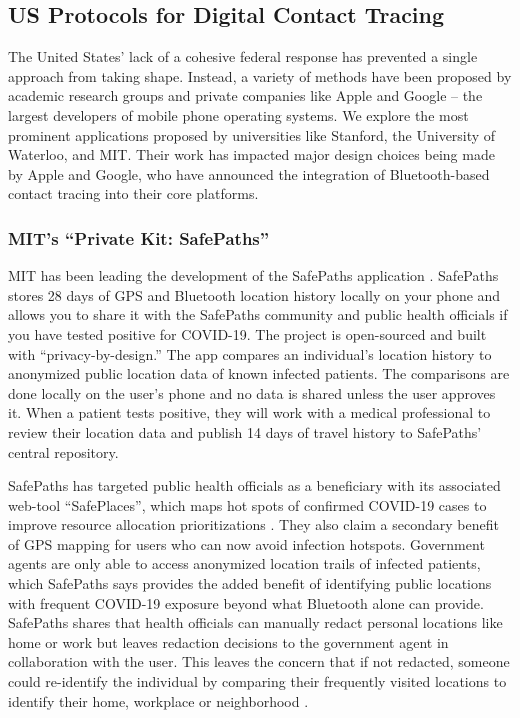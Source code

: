 \documentclass{article}
\begin{document}
\subsection{US Protocols for Digital Contact Tracing}

The United States’ lack of a cohesive federal response has prevented a single approach from taking shape. Instead, a variety of methods have been proposed by academic research groups and private companies like Apple and Google – the largest developers of mobile phone operating systems. We explore the most prominent applications proposed by universities like Stanford, the University of Waterloo, and MIT. Their work has impacted major design choices being made by Apple and Google, who have announced the integration of Bluetooth-based contact tracing into their core platforms.

\subsubsection{MIT’s “Private Kit: SafePaths”}
MIT has been leading the development of the SafePaths application \cite{COVIDSafePaths}. SafePaths stores 28 days of GPS and Bluetooth location history locally on your phone and allows you to share it with the SafePaths community and public health officials if you have tested positive for COVID-19. The project is open-sourced \cite{COVIDSafePathsSource} and built with “privacy-by-design.” The app compares an individual’s location history to anonymized public location data of known infected patients. The comparisons are done locally on the user’s phone and no data is shared unless the user approves it. When a patient tests positive, they will work with a medical professional to review their location data and publish 14 days of travel history to SafePaths’ central repository.

SafePaths has targeted public health officials as a beneficiary with its associated web-tool “SafePlaces”, which maps hot spots of confirmed COVID-19 cases to improve resource allocation prioritizations \cite{COVIDSafePathsFAQ}. They also claim a secondary benefit of GPS mapping for users who can now avoid infection hotspots. Government agents are only able to access anonymized location trails of infected patients, which SafePaths says provides the added benefit of identifying public locations with frequent COVID-19 exposure beyond what Bluetooth alone can provide. SafePaths shares that health officials can manually redact personal locations like home or work but leaves redaction decisions to the government agent in collaboration with the user. This leaves the concern that if not redacted, someone could re-identify the individual by comparing their frequently visited locations to identify their home, workplace or neighborhood \cite{MobilityTraces}. 
\end{document}

